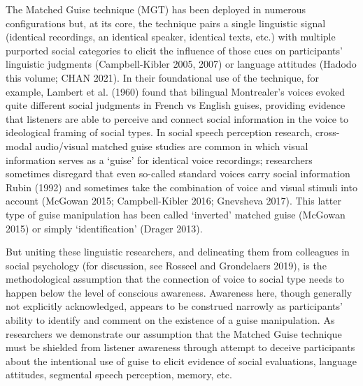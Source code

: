 \documentclass[
  letterpaper,
  DIV=11,
  numbers=noendperiod]{scrartcl}
\begin{document}
The Matched Guise technique (MGT) has been deployed in numerous
configurations but, at its core, the technique pairs a single linguistic
signal (identical recordings, an identical speaker, identical texts,
etc.) with multiple purported social categories to elicit the influence
of those cues on participants' linguistic judgments (Campbell-Kibler
2005, 2007) or language attitudes (Hadodo this volume; CHAN 2021). In
their foundational use of the technique, for example, Lambert et al.
(1960) found that bilingual Montrealer's voices evoked quite different
social judgments in French vs English guises, providing evidence that
listeners are able to perceive and connect social information in the
voice to ideological framing of social types. In social speech
perception research, cross-modal audio/visual matched guise studies are
common in which visual information serves as a `guise' for identical
voice recordings; researchers sometimes disregard that even so-called
standard voices carry social information Rubin (1992) and sometimes take
the combination of voice and visual stimuli into account (McGowan 2015;
Campbell-Kibler 2016; Gnevsheva 2017). This latter type of guise
manipulation has been called `inverted' matched guise (McGowan 2015) or
simply `identification' (Drager 2013).

But uniting these linguistic researchers, and delineating them from
colleagues in social psychology (for discussion, see Rosseel and
Grondelaers 2019), is the methodological assumption that the connection
of voice to social type needs to happen below the level of conscious
awareness. Awareness here, though generally not explicitly acknowledged,
appears to be construed narrowly as participants' ability to identify
and comment on the existence of a guise manipulation. As researchers we
demonstrate our assumption that the Matched Guise technique must be
shielded from listener awareness through attempt to deceive participants
about the intentional use of guise to elicit evidence of social
evaluations, language attitudes, segmental speech perception, memory,
etc.
\end{document}
